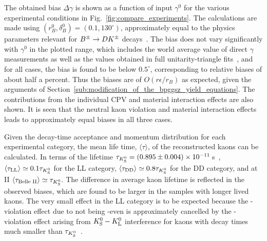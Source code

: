 The obtained bias $\Delta\gamma$ is shown as a function of input $\gamma^0$ for the various experimental conditions in Fig.~\ref{fig:compare_experiments}. The calculations are made using $(r_B^0, \delta_B^0)=(0.1, 130^\circ)$, approximately equal to the physics parameters relevant for ${{B}^\pm}\rightarrow{\ensuremath{D}}{\ensuremath{{K}^\pm}}$ decays~\cite{UTfit-UT,HFLAV}.  The bias does not vary significantly with $\gamma^0$ in the plotted range, which includes the world average value of direct $\gamma$ measurements as well as the values obtained in full unitarity-triangle fits~\cite{HFLAV,UTfit-UT,CKMfitter2015}, and for all cases, the bias is found to be below $0.5^\circ$, corresponding to relative biases of about half a percent. Thus the biases are of $O(r\epsilon /r_B)$ as expected, given the arguments of Section~\ref{sub:modification_of_the_bpggsz_yield_equations}. The contributions from the individual \KS CPV and material interaction effects are also shown. It is seen that the neutral kaon \CP violation and material interaction effects leads to approximately equal biases in all three cases. 

Given the decay-time acceptance and momentum distribution for each experimental category, the mean life time, $\langle\tau\rangle$, of the reconstructed kaons can be calculated. In terms of the \KS lifetime ${\tau_{{K}^0_{\mathrm{S}}}=(0.895\pm0.004)\times10^{-11}\,}$s~\cite{PDG2020}, $\langle\tau_\text{LL}\rangle\simeq0.1\tau_{{K}^0_{\mathrm{S}}}$ for the \lhcb LL category, $\langle\tau_\text{DD}\rangle\simeq0.8\tau_{{K}^0_{\mathrm{S}}}$ for the \lhcb DD category, and at \belle II $\langle\tau_\text{Belle II}\rangle\simeq\tau_{{K}^0_{\mathrm{S}}}$. The difference in average kaon lifetime is reflected in the observed biases, which are found to be larger in the samples with longer lived kaons. The very small effect in the LL category is to be expected because the \CP-violation effect due to \KS not being \CP-even is approximately cancelled by the \CP-violation effect arising from ${{K}^0_{\mathrm{S}}}-{{K}^0_{\mathrm{L}}}$ interference for kaons with decay times much smaller than $\tau_{{K}^0_{\mathrm{S}}}$~\cite{grossmanCPViolationKSv2012}. 

